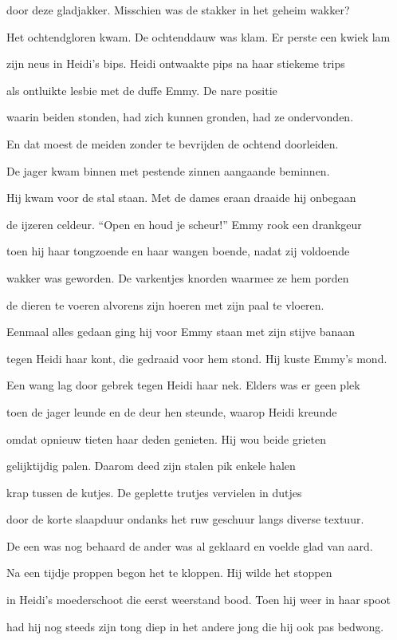 door deze gladjakker.
Misschien was de stakker
in het geheim wakker?

Het ochtendgloren kwam.
De ochtenddauw was klam.
Er perste een kwiek lam

zijn neus in Heidi’s bips.
Heidi ontwaakte pips
na haar stiekeme trips

als ontluikte lesbie
met de duffe Emmy.
De nare positie

waarin beiden stonden,
had zich kunnen gronden,
had ze ondervonden.

En dat moest de meiden
zonder te bevrijden
de ochtend doorleiden.

De jager kwam binnen
met pestende zinnen
aangaande beminnen.

Hij kwam voor de stal staan.
Met de dames eraan
draaide hij onbegaan

de ijzeren celdeur.
“Open en houd je scheur!”
Emmy rook een drankgeur

toen hij haar tongzoende
en haar wangen boende,
nadat zij voldoende

wakker was geworden.
De varkentjes knorden
waarmee ze hem porden

de dieren te voeren
alvorens zijn hoeren
met zijn paal te vloeren.

Eenmaal alles gedaan
ging hij voor Emmy staan
met zijn stijve banaan

tegen Heidi haar kont,
die gedraaid voor hem stond.
Hij kuste Emmy’s mond.

Een wang lag door gebrek
tegen Heidi haar nek.
Elders was er geen plek

toen de jager leunde
en de deur hen steunde,
waarop Heidi kreunde

omdat opnieuw tieten
haar deden genieten.
Hij wou beide grieten

gelijktijdig palen.
Daarom deed zijn stalen
pik enkele halen

krap tussen de kutjes.
De geplette trutjes
vervielen in dutjes

door de korte slaapduur
ondanks het ruw geschuur
langs diverse textuur.

De een was nog behaard
de ander was al geklaard
en voelde glad van aard.

Na een tijdje proppen
begon het te kloppen.
Hij wilde het stoppen

in Heidi’s moederschoot
die eerst weerstand bood.
Toen hij weer in haar spoot

had hij nog steeds zijn tong
diep in het andere jong
die hij ook pas bedwong.


